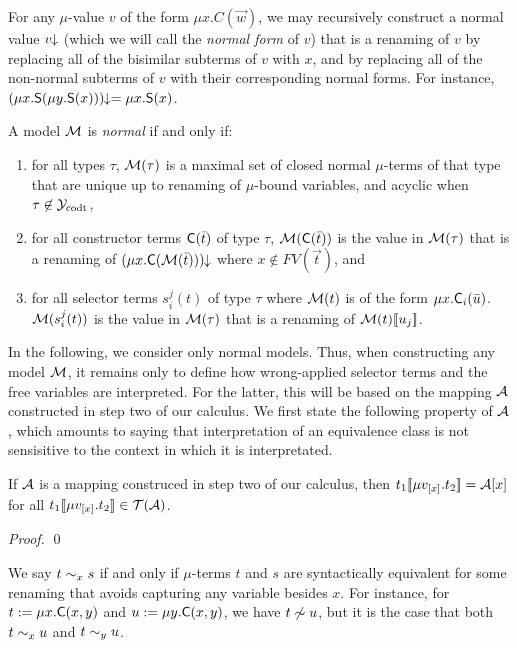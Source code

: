 For any $\mu$-value $v$ of the form $\mu x. C( \vec w )$, we may recursively construct a normal value ${v}\!\!\downarrow$
(which we will call the \emph{normal form} of $v$)
that is a renaming of $v$ by replacing all of the bisimilar subterms of $v$ with $x$,
and by replacing all of the non-normal subterms of $v$ with their corresponding normal forms.
For instance, ${(\mu x. \textsf{S}( \mu y. \textsf{S}( x ) ))}\!\!\downarrow = \mu x. \textsf{S}( x )$.

\begin{definition} \label{def:norm-model}
A model $\mathcal{M}$ is \emph{normal} if and only if:
\begin{enumerate}
\item 
for all types $\tau$, 
$\mathcal{M}( \tau )$ is a maximal set of closed normal $\mu$-terms of that type that are 
unique up to renaming of $\mu$-bound variables,
and acyclic when $\tau \not\in \mathcal{Y}_{\mathrm{codt}}$,
\item 
for all constructor terms $\textsf{C}( \bar t )$ of type $\tau$,
$\mathcal{M}( \textsf{C}( \bar t ) )$ is the value 
in $\mathcal{M}( \tau )$ that is a renaming of 
${(\mu x. \textsf{C}( \mathcal{M}( \bar t ) ))}\!\!\downarrow$ where $x \not\in FV( \vec t )$, and
\item 
for all selector terms $s^j_i( t )$ of type $\tau$ where $\mathcal{M}( t )$ is of the form $\mu x. \textsf{C}_i( \bar u )$.%
$\mathcal{M}( s^j_i( t ) )$ is the value
in $\mathcal{M}( \tau )$ that is a renaming of 
$\mathcal{M}( t )[\![ u_j ]\!]$.
\end{enumerate}
\end{definition}

In the following, we consider only normal models.
Thus, when constructing any model $\mathcal{M}$,
it remains only to define how wrong-applied selector terms and the free variables are interpreted.
For the latter, this will be based on the mapping $\mathcal{A}$ constructed in step two of our calculus.
We first state the following property of $\mathcal{A}$, which amounts to saying that interpretation of an equivalence class is
not sensisitive to the context in which it is interpretated.

\begin{lemma}
If $\mathcal{A}$ is a mapping construced in step two of our calculus,
then $t_1 [\![  \mu v_{[ x ]}. t_2  ]\!] = \mathcal{A} [ x ]$
for all $t_1[\![ \mu v_{[ x ]}. t_2 ]\!] \in \mathcal{T}(\mathcal{A})$.
\end{lemma}
\begin{proof}
\qed
\end{proof}

We say $t \sim_{x} s$ if and only if $\mu$-terms $t$ and $s$ are syntactically equivalent
for some renaming that avoids capturing any variable besides $x$.
For instance, for $t:= \mu x. \textsf{C}( x, y )$ and $u := \mu y. \textsf{C}( x, y )$,
we have $t \not\sim u$, but it is the case that both
$t \sim_{x} u$ and $t \sim_{y} u$.

